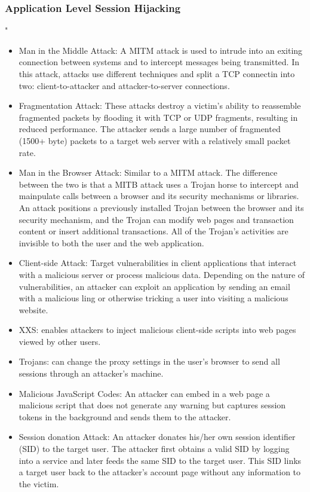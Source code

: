\subsubsection{Application Level Session Hijacking}"
\begin{itemize}
    \item Man in the Middle Attack: A MITM attack is used to intrude into an exiting connection between systems and to intercept messages being transmitted. In this attack, attacks use different techniques and split a TCP connectin into two: client-to-attacker and attacker-to-server connections.
    \item Fragmentation Attack: These attacks destroy a victim's ability to reassemble fragmented packets by flooding it with TCP or UDP fragments, resulting in reduced performance. The attacker sends a large number of fragmented (1500+ byte) packets to a target web server with a relatively small packet rate.
    \item Man in the Browser Attack: Similar to a MITM attack. The difference between the two is that a MITB attack uses a Trojan horse to intercept and mainpulate calls between a browser and its security mechanisms or libraries. An attack positions a previously installed Trojan between the browser and its security mechanism, and the Trojan can modify web pages and transaction content or insert additional transactions. All of the Trojan's activities are invisible to both the user and the web application.
    \item Client-side Attack: Target vulnerabilities in client applications that interact with a malicious server or process malicious data. Depending on the nature of vulnerabilities, an attacker can exploit an application by sending an email with a malicious ling or otherwise tricking a user into visiting a malicious website. 
    \item XXS: enables attackers to inject malicious client-side scripts into web pages viewed by other users.
    \item Trojans: can change the proxy settings in the user's browser to send all sessions through an attacker's machine.
    \item Malicious JavaScript Codes: An attacker can embed in a web page a malicious script that does not generate any warning but captures session tokens in the background and sends them to the attacker.
    \item Session donation Attack: An attacker donates his/her own session identifier (SID) to the target user. The attacker first obtains a valid SID by logging into a service and later feeds the same SID to the target user. This SID links a target user back to the attacker's account page without any information to the victim.

\end{itemize}
